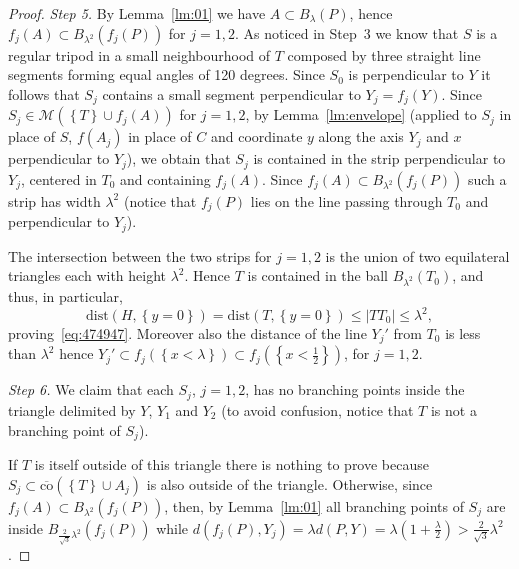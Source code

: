 \documentclass{amsart}
\newcommand{\abs}[1]{\left\vert #1 \right\vert}
\newcommand{\enclose}[1]{\left(#1\right)}
\newcommand{\ENCLOSE}[1]{\left\{#1\right\}}
\newcommand{\M}{\mathcal{M}}
\newcommand{\dist}{\mathrm{dist}}
\newcommand{\co}{\mathrm{co}}
\theoremstyle{definition}
\theoremstyle{remark}
\begin{document}
\begin{proof}
  \emph{Step 5.}
  By Lemma~\ref{lm:01} we have $A\subset B_\lambda(P)$,
  hence $f_j(A) \subset B_{\lambda^2}(f_j(P))$
  for $j=1,2$.
  As noticed in Step~3 we know that $S$ is a regular tripod in a small 
  neighbourhood of $T$ composed by three straight line segments forming 
  equal angles of 120 degrees. Since $S_0$ is perpendicular to $Y$ 
  it follows that $S_j$ contains a small segment perpendicular to $Y_j=f_j(Y)$.
  Since $S_j\in \M(\ENCLOSE{T}\cup f_j(A))$ for $j=1,2$,
  by Lemma~\ref{lm:envelope} (applied to $S_j$ in place of $S$, 
  $f(A_j)$ in place of $C$ and coordinate $y$ along the axis $Y_j$ 
  and $x$ perpendicular to $Y_j$),
  we obtain that $S_j$ is contained in the strip perpendicular 
  to $Y_j$, centered in $T_0$ and containing $f_j(A)$. 
  Since $f_j(A)\subset B_{\lambda^2}(f_j(P))$
  such a strip has width $\lambda^2$
  (notice that $f_j(P)$ lies on the line passing through $T_0$ and perpendicular 
  to $Y_j$).
  
  The intersection between the two strips for $j=1,2$ 
  is the union of two equilateral 
  triangles each with height $\lambda^2$. 
  Hence $T$ is contained in the ball
  $B_{\lambda^2}(T_0)$, 
  and thus, in particular, 
  \[
    \dist(H,\ENCLOSE{y=0})= \dist(T,\ENCLOSE{y=0})\le \abs{TT_0} \le \lambda^2,
  \]
  proving~\eqref{eq:474947}.
  Moreover also the distance of the line $Y_j'$ from $T_0$ is less than 
  $\lambda^2$ hence $Y_j'\subset f_j(\ENCLOSE{x<\lambda})
  \subset f_j(\ENCLOSE{x<\frac 1 2})$, for $j=1,2$.
  
  \emph{Step 6.}
  We claim that each $S_j$, $j=1,2$, has no branching points inside the triangle 
  delimited by $Y$, $Y_1$ and $Y_2$ 
  (to avoid confusion, notice that $T$ is not a branching point of $S_j$).
 
  If $T$ is itself outside of this triangle there is nothing to prove
  because $S_j\subset \overline{\co}(\ENCLOSE{T}\cup A_j)$ 
  is also outside of the triangle.
  Otherwise, 
  since $f_j(A)\subset B_{\lambda^2}(f_j(P))$,
  then, by Lemma~\ref{lm:01} all branching points of $S_j$ 
  are inside $B_{\frac{2}{\sqrt 3}\lambda^2}(f_j(P))$ while 
  $d(f_j(P),Y_j)=\lambda d(P,Y)
  = \lambda \enclose{1+\frac{\lambda} 2 }
  > \frac{2}{\sqrt 3}\lambda^2$.


\end{proof}
\end{document}
